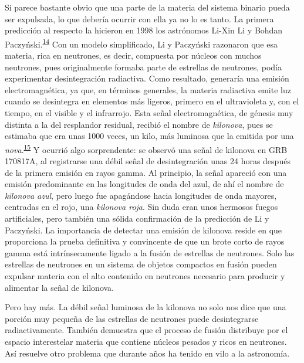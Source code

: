 Si parece bastante obvio que una parte de la materia del sistema binario pueda ser expulsada, lo que debería ocurrir con ella ya no lo es tanto. La primera predicción al respecto la hicieron en 1998 los astrónomos Li-Xin Li y Bohdan Paczyński.\textsuperscript{\hyperlink{note:08-14}{14}} Con un modelo simplificado, Li y Paczyński razonaron que esa materia, rica en neutrones, es decir, compuesta por núcleos con muchos neutrones, pues originalmente formaba parte de estrellas de neutrones, podía experimentar desintegración radiactiva. Como resultado, generaría una emisión electromagnética, ya que, en términos generales, la materia radiactiva emite luz cuando se desintegra en elementos más ligeros, primero en el ultravioleta y, con el tiempo, en el visible y el infrarrojo. Esta señal electromagnética, de génesis muy distinta a la del resplandor residual, recibió el nombre de \emph{kilonova}, pues se estimaba que era unas 1000 veces, un kilo, más luminosa que la emitida por una \emph{nova}.\textsuperscript{\hyperlink{note:08-15}{15}} Y ocurrió algo sorprendente: se observó una señal de kilonova en GRB 170817A, al registrarse una débil señal de desintegración unas 24 horas después de la primera emisión en rayos gamma. Al principio, la señal apareció con una emisión predominante en las longitudes de onda del azul, de ahí el nombre de \emph{kilonova azul}, pero luego fue apagándose hacia longitudes de onda mayores, centradas en el rojo, una \emph{kilonova roja}. Sin duda eran unos hermosos fuegos artificiales, pero también una sólida confirmación de la predicción de Li y Paczyński. La importancia de detectar una emisión de kilonova reside en que proporciona la prueba definitiva y convincente de que un brote corto de rayos gamma está intrínsecamente ligado a la fusión de estrellas de neutrones. Solo las estrellas de neutrones en un sistema de objetos compactos en fusión pueden expulsar materia con el alto contenido en neutrones necesario para producir y alimentar la señal de kilonova.

Pero hay más. La débil señal luminosa de la kilonova no solo nos dice que una porción muy pequeña de las estrellas de neutrones puede desintegrarse radiactivamente. También demuestra que el proceso de fusión distribuye por el espacio interestelar materia que contiene núcleos pesados y ricos en neutrones. Así resuelve otro problema que durante años ha tenido en vilo a la astronomía.

